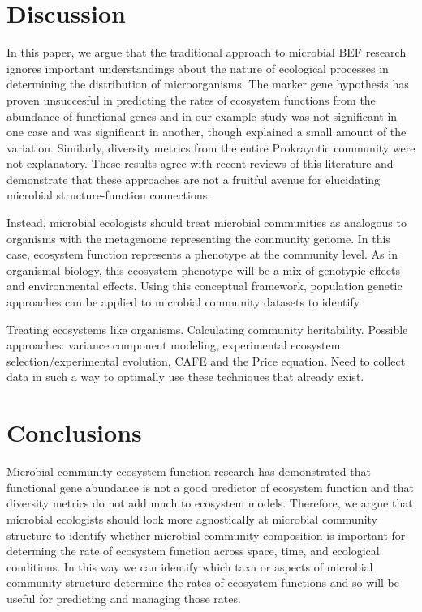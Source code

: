 \documentclass{article}
\begin{document}
\section{Discussion}

In this paper, we argue that the traditional approach to microbial BEF research
ignores important understandings about the nature of ecological processes in
determining the distribution of microorganisms. The marker gene hypothesis has
proven unsuccesful in predicting the rates of ecosystem functions from the
abundance of functional genes and in our example study was not significant in one case and
was significant in another, though explained a small amount of the variation.
Similarly, diversity metrics from the entire Prokrayotic community were not
explanatory. These results agree with recent reviews of this literature and
demonstrate that these approaches are not a fruitful avenue for elucidating
microbial structure-function connections. 

Instead, microbial ecologists should treat microbial communities as analogous to
organisms with the metagenome representing the community genome. In this case,
ecosystem function represents a phenotype at the community level. As in
organismal biology, this ecosystem phenotype will be a mix of genotypic effects and
environmental effects. Using this conceptual framework, population genetic
approaches can be applied to microbial community datasets to identify 

Treating ecosystems like organisms. Calculating community heritability. Possible
approaches: variance component modeling, experimental ecosystem
selection/experimental evolution, CAFE and the Price equation. Need to collect
data in such a way to optimally use these techniques that already exist.

\section{Conclusions}
Microbial community ecosystem function research has demonstrated that
functional gene abundance is not a good predictor of ecosystem function and
that diversity metrics do not add much to ecosystem models. Therefore, we
argue that microbial ecologists should look more agnostically at microbial
community structure to identify whether microbial community composition is
important for determing the rate of ecosystem function across space, time,
and ecological conditions. In this way we can identify which taxa or aspects of
microbial community structure determine the rates of ecosystem functions and so
will be useful for predicting and managing those rates. 
\end{document}
